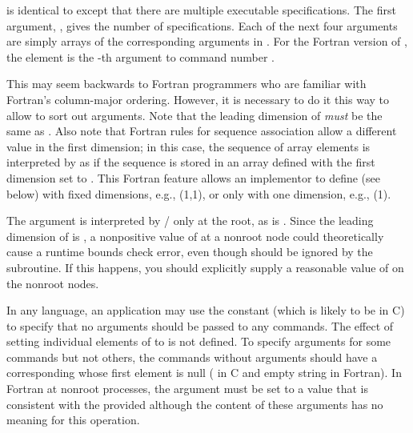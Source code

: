  is identical to  except
that there are multiple executable specifications. The first argument,
, gives the number of specifications. Each of the
next four arguments are simply arrays of the corresponding arguments
in .
For the Fortran version of , the element
 is the
-th
argument to command number .
\begin{rationale}
This may seem backwards to
Fortran programmers who are familiar with Fortran's
column-major ordering. However, it is necessary to do
it this way to allow  to sort out
arguments. Note that the leading dimension of
 \emph{must} be the same as
.
Also note that Fortran rules for sequence association allow a different
value in the first dimension; in this case, the sequence of array elements
is interpreted by  as if the sequence
is stored in an array defined with the first dimension set to .
This Fortran feature allows an implementor to define 
(see below) with fixed dimensions, e.g., (1,1), or only with one dimension, e.g., (1).
\end{rationale}
\begin{users}
The argument  is interpreted by \MPI/ only at the root,
as is . Since the leading dimension
of  is , a nonpositive
value of  at a nonroot node could theoretically
cause a runtime bounds check error, even though
 should be ignored by the
subroutine. If this happens, you should explicitly
supply a reasonable value of  on the nonroot
nodes.
\end{users}

In any language, an application may use the constant
 (which is likely to be  in C)
to specify that no arguments should be passed to any
commands. The effect of setting individual elements of 
to  is not defined. To specify arguments
for some commands but not others, the commands without
arguments should have a corresponding  whose
first element is null ( in C and empty string in Fortran).
%
In Fortran at nonroot processes, the  argument must
be set to a value that is consistent with the provided
 although the content of these arguments
has no meaning for this operation.


